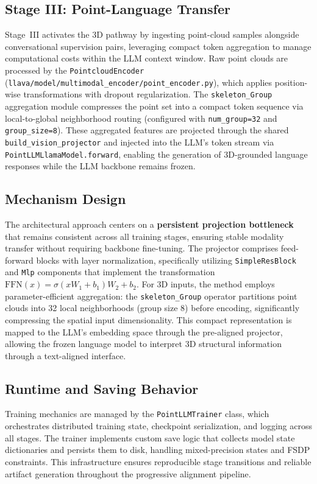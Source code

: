 \subsection{Stage III: Point-Language Transfer}\label{subsec:stage3}

Stage~III activates the 3D pathway by ingesting point-cloud samples alongside conversational supervision pairs, leveraging compact token aggregation to manage computational costs within the LLM context window. Raw point clouds are processed by the \texttt{PointcloudEncoder} (\texttt{llava/model/multimodal\_encoder/point\_encoder.py}), which applies position-wise transformations with dropout regularization. The \texttt{skeleton\_Group} aggregation module compresses the point set into a compact token sequence via local-to-global neighborhood routing (configured with \texttt{num\_group=32} and \texttt{group\_size=8}). These aggregated features are projected through the shared \texttt{build\_vision\_projector} and injected into the LLM's token stream via \texttt{PointLLMLlamaModel.forward}, enabling the generation of 3D-grounded language responses while the LLM backbone remains frozen.

\subsection{Mechanism Design}\label{subsec:mechanism}

The architectural approach centers on a \textbf{persistent projection bottleneck} that remains consistent across all training stages, ensuring stable modality transfer without requiring backbone fine-tuning. The projector comprises feed-forward blocks with layer normalization, specifically utilizing \texttt{SimpleResBlock} and \texttt{Mlp} components that implement the transformation $\mathrm{FFN}(x)=\sigma(xW_1+b_1)W_2+b_2$. For 3D inputs, the method employs parameter-efficient aggregation: the \texttt{skeleton\_Group} operator partitions point clouds into 32 local neighborhoods (group size 8) before encoding, significantly compressing the spatial input dimensionality. This compact representation is mapped to the LLM's embedding space through the pre-aligned projector, allowing the frozen language model to interpret 3D structural information through a text-aligned interface.

\subsection{Runtime and Saving Behavior}\label{subsec:runtime}

Training mechanics are managed by the \texttt{PointLLMTrainer} class, which orchestrates distributed training state, checkpoint serialization, and logging across all stages. The trainer implements custom save logic that collects model state dictionaries and persists them to disk, handling mixed-precision states and FSDP constraints. This infrastructure ensures reproducible stage transitions and reliable artifact generation throughout the progressive alignment pipeline.